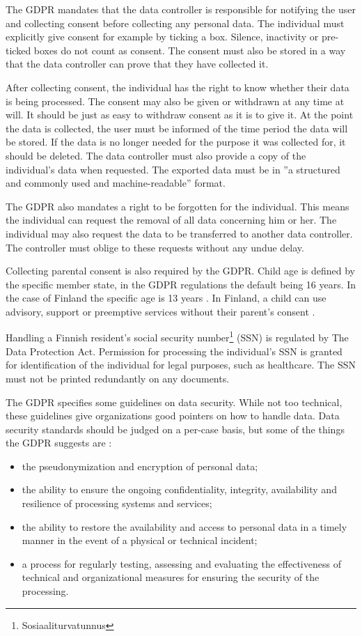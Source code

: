 The GDPR mandates that the data controller is responsible for notifying the user and collecting consent before collecting any personal data.
The individual must explicitly give consent for example by ticking a box. Silence, inactivity or pre-ticked boxes do not count as consent.
The consent must also be stored in a way that the data controller can prove that they have collected it.
\cite{gdpr}

After collecting consent, the individual has the right to know whether their data is being processed.
The consent may also be given or withdrawn at any time at will.
It should be just as easy to withdraw consent as it is to give it.
At the point the data is collected, the user must be informed of the time period the data will be stored.
If the data is no longer needed for the purpose it was collected for, it should be deleted.
The data controller must also provide a copy of the individual's data when requested.
The exported data must be in ''a structured and commonly used and machine-readable'' format.
\cite{gdpr}

The GDPR also mandates a right to be forgotten for the individual.
This means the individual can request the removal of all data concerning him or her.
The individual may also request the data to be transferred to another data controller.
The controller must oblige to these requests without any undue delay.
\cite{gdpr}

Collecting parental consent is also required by the GDPR.
Child age is defined by the specific member state, in the GDPR regulations the default being 16 years. \cite{gdpr}
In the case of Finland the specific age is 13 years \cite{tietosuojalaki}. 
In Finland, a child can use advisory, support or preemptive services without their parent's consent \cite{tietosuojavaltuusto}.

Handling a Finnish resident's social security number\footnote{Sosiaaliturvatunnus} (SSN) is regulated by The Data Protection Act.
Permission for processing the individual's SSN is granted for identification of the individual for legal purposes, such as healthcare.
The SSN must not be printed redundantly on any documents.
\cite{tietosuojalaki}

The GDPR specifies some guidelines on data security.
While not too technical, these guidelines give organizations good pointers on how to handle data.
Data security standards should be judged on a per-case basis, but some of the things the GDPR suggests are \cite{gdpr}:
\begin{itemize}
    \item the pseudonymization and encryption of personal data;
    \item the ability to ensure the ongoing confidentiality, integrity, availability and resilience of processing systems and services;
    \item the ability to restore the availability and access to personal data in a timely manner in the event of a physical or technical incident;
    \item a process for regularly testing, assessing and evaluating the effectiveness of technical and organizational measures for ensuring the security of the processing.
\end{itemize}


